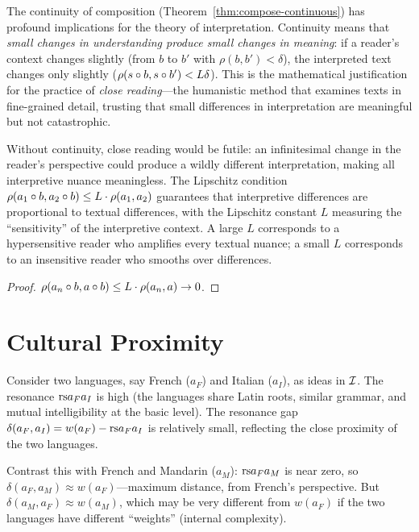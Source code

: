 \begin{interpretation}
\label{interp:ch11:continuity_hermeneutics}
The continuity of composition (Theorem~\ref{thm:compose-continuous}) has
profound implications for the theory of interpretation.  Continuity means
that \emph{small changes in understanding produce small changes in meaning}:
if a reader's context changes slightly (from $b$ to $b'$ with
$\rho(b, b') < \delta$), the interpreted text changes only slightly
($\rho(s \circ b, s \circ b') < L\delta$).  This is the mathematical
justification for the practice of \emph{close reading}---the humanistic
method that examines texts in fine-grained detail, trusting that small
differences in interpretation are meaningful but not catastrophic.

Without continuity, close reading would be futile: an infinitesimal change
in the reader's perspective could produce a wildly different interpretation,
making all interpretive nuance meaningless.  The Lipschitz condition
$\rho(a_1 \circ b, a_2 \circ b) \leq L \cdot \rho(a_1, a_2)$
guarantees that interpretive differences are proportional to textual
differences, with the Lipschitz constant $L$ measuring the ``sensitivity''
of the interpretive context.  A large $L$ corresponds to a hypersensitive
reader who amplifies every textual nuance; a small $L$ corresponds to an
insensitive reader who smooths over differences.
\end{interpretation}



\begin{proof}
$\rho(a_n \circ b, a \circ b) \leq L \cdot \rho(a_n, a) \to 0$.
\end{proof}

\section{Cultural Proximity}

\begin{example}
\label{ex:linguistic}
Consider two languages, say French ($a_F$) and Italian ($a_I$), as ideas in
$\mathcal{I}$.  The resonance $\mathrm{rs}{a_F}{a_I}$ is high (the languages share Latin
roots, similar grammar, and mutual intelligibility at the basic level).
The resonance gap $\delta(a_F, a_I) = w(a_F) - \mathrm{rs}{a_F}{a_I}$ is relatively
small, reflecting the close proximity of the two languages.

Contrast this with French and Mandarin ($a_M$): $\mathrm{rs}{a_F}{a_M}$ is near zero,
so $\delta(a_F, a_M) \approx w(a_F)$---maximum distance, from French's
perspective.  But $\delta(a_M, a_F) \approx w(a_M)$, which may be very
different from $w(a_F)$ if the two languages have different ``weights''
(internal complexity).
\end{example}

